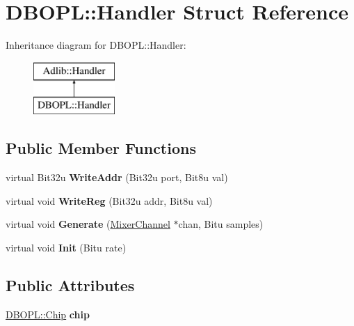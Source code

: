 \hypertarget{structDBOPL_1_1Handler}{\section{D\-B\-O\-P\-L\-:\-:Handler Struct Reference}
\label{structDBOPL_1_1Handler}
}
Inheritance diagram for D\-B\-O\-P\-L\-:\-:Handler\-:\begin{figure}[H]
\begin{center}
\leavevmode
\includegraphics[height=2.000000cm]{structDBOPL_1_1Handler}
\end{center}
\end{figure}
\subsection*{Public Member Functions}
\begin{DoxyCompactItemize}
\item 
\hypertarget{structDBOPL_1_1Handler_aac8e64336d3c16e778a429855c190a34}{virtual Bit32u {\bfseries Write\-Addr} (Bit32u port, Bit8u val)}\label{structDBOPL_1_1Handler_aac8e64336d3c16e778a429855c190a34}

\item 
\hypertarget{structDBOPL_1_1Handler_a64375f69fc5a044cdd06d39bb1194a1c}{virtual void {\bfseries Write\-Reg} (Bit32u addr, Bit8u val)}\label{structDBOPL_1_1Handler_a64375f69fc5a044cdd06d39bb1194a1c}

\item 
\hypertarget{structDBOPL_1_1Handler_a920b1f34a74cae5b0347275de5ecdaea}{virtual void {\bfseries Generate} (\hyperlink{classMixerChannel}{Mixer\-Channel} $\ast$chan, Bitu samples)}\label{structDBOPL_1_1Handler_a920b1f34a74cae5b0347275de5ecdaea}

\item 
\hypertarget{structDBOPL_1_1Handler_ad7bb128c4f9b7100bf26e8bd4aaec029}{virtual void {\bfseries Init} (Bitu rate)}\label{structDBOPL_1_1Handler_ad7bb128c4f9b7100bf26e8bd4aaec029}

\end{DoxyCompactItemize}
\subsection*{Public Attributes}
\begin{DoxyCompactItemize}
\item 
\hypertarget{structDBOPL_1_1Handler_a5706eaa478a73368d63b806cea0d8e34}{\hyperlink{structDBOPL_1_1Chip}{D\-B\-O\-P\-L\-::\-Chip} {\bfseries chip}}\label{structDBOPL_1_1Handler_a5706eaa478a73368d63b806cea0d8e34}

\end{DoxyCompactItemize}


